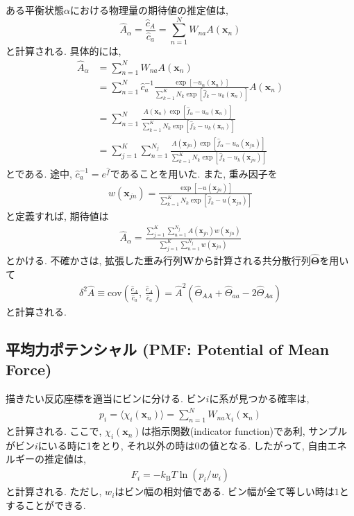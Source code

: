 ある平衡状態$\alpha$における物理量の期待値の推定値は, 
\begin{equation}
    \hat{A}_{\alpha} =
    \frac{\hat{c}_{A}}{\hat{c}_{a}} =
    \sum_{n=1}^{N} W_{na} A(\bm{x}_{n})
\end{equation}
と計算される. 具体的には, 
\begin{align}
    \hat{A}_{\alpha}
    &=
    \sum_{n=1}^{N} W_{na} A(\bm{x}_{n})
    \\ &=
    \sum_{n=1}^{N}
    \hat{c}_{a}^{-1}
    \frac{
        \exp[-u_{\alpha}(\bm{x}_{n})]
    }{
        \sum_{k=1}^{K} N_{k} \exp[\hat{f}_{k} - u_{k}(\bm{x}_{n})]
    }
    A(\bm{x}_{n})
    \\ &=
    \sum_{n=1}^{N}
    \frac{
        A(\bm{x}_{n}) \exp[\hat{f}_{\alpha} - u_{\alpha}(\bm{x}_{n})]
    }{
        \sum_{k=1}^{K} N_{k} \exp[\hat{f}_{k} - u_{k}(\bm{x}_{n})]
    }
    \\ &=
    \sum_{j=1}^{K} \sum_{n=1}^{N_{j}}
    \frac{
        A(\bm{x}_{jn}) \exp[\hat{f}_{\alpha} - u_{\alpha}(\bm{x}_{jn})]
    }{
        \sum_{k=1}^{K} N_{k} \exp[\hat{f}_{k} - u_{k}(\bm{x}_{jn})]
    }
\end{align}
とである. 途中, $\hat{c}_{a}^{-1} = e^{\hat{f}}$であることを用いた. 
また, 重み因子を
\begin{align}
    w(\bm{x}_{jn}) =
    \frac{
        \exp[-u(\bm{x}_{jn})]
    }{
        \sum_{k=1}^{K} N_{k} \exp[\hat{f}_{k} - u(\bm{x}_{jn})]
    }
\end{align}
と定義すれば, 期待値は
\begin{align}
    \hat{A}_{\alpha} =
    \frac{
        \sum_{j=1}^{K} \sum_{n=1}^{N_{j}} A(\bm{x}_{jn}) w(\bm{x}_{jn})
    }{
        \sum_{j=1}^{K} \sum_{n=1}^{N_{j}} w(\bm{x}_{jn})
    }
\end{align}
とかける. 不確かさは, 拡張した重み行列$\bm{W}$から計算される共分散行列$\hat{\bm{\Theta}}$を用いて
\begin{align}
    \delta^{2} \hat{A}
    \equiv
    \mathrm{cov}
    \left(
        \frac{\hat{c}_{A}}{\hat{c}_{a}},~
        \frac{\hat{c}_{A}}{\hat{c}_{a}}
    \right)
    =
    \hat{A}^{2}
    \left(
        \hat{\Theta}_{AA} + \hat{\Theta}_{aa} - 2\hat{\Theta}_{Aa}
    \right)
\end{align}
と計算される. 

\subsection{平均力ポテンシャル (PMF: Potential of Mean Force)}
描きたい反応座標を適当にビンに分ける. 
ビン$i$に系が見つかる確率は, 
\begin{align}
    p_{i} =
    \langle \chi_{i}(\bm{x}_{n}) \rangle =
    \sum_{n=1}^{N} W_{na} \chi_{i}(\bm{x}_{n})
\end{align}
と計算される. 
ここで, $\chi_{i}(\bm{x}_{n})$は指示関数(indicator function)であ利, サンプルがビン$i$にいる時に1をとり, それ以外の時は0の値となる. 
したがって, 自由エネルギーの推定値は, 
\begin{align}
    F_{i} = -k_{\mathrm{B}}T \ln(p_{i}/w_{i})
\end{align}
と計算される. ただし, $w_{i}$はビン幅の相対値である. ビン幅が全て等しい時は$1$とすることができる. 

